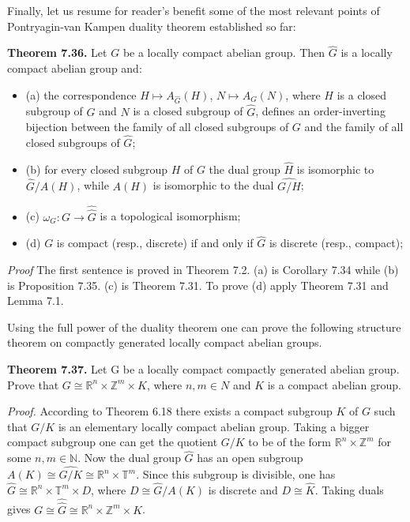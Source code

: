 \documentclass[12pt]{article}
\begin{document}
Finally, let us resume for reader's benefit some of the most relevant points of Pontryagin-van Kampen duality
theorem established so far:


\textbf{Theorem 7.36.} Let $G$ be a locally compact abelian group. Then $\hat{G}$ is a locally compact abelian group and:


\begin{itemize}

    \item (a) the correspondence $H \mapsto A_{\hat{G}}(H)$, $N \mapsto A_G(N)$, where $H$ is a closed subgroup of $G$ and $N$ is a closed
    subgroup of $\hat{G}$, defines an order-inverting bijection between the family of all closed subgroups of $G$ and the
    family of all closed subgroups of $\hat{G}$;

    \item (b) for every closed subgroup $H$ of $G$ the dual group $\hat{H}$ is isomorphic to $\hat{G}/A (H)$, while $A(H)$ is isomorphic
    to the dual $\hat{G/H}$;

    \item (c) $\omega_G : G \to \hat{\hat{G}}$ is a topological isomorphism;

    \item (d) $G$ is compact (resp., discrete) if and only if $\hat{G}$ is discrete (resp., compact);

\end{itemize}


\emph{Proof} The first sentence is proved in Theorem 7.2. (a) is Corollary 7.34 while (b) is Proposition 7.35. (c) is
Theorem 7.31. To prove (d) apply Theorem 7.31 and Lemma 7.1.


    Using the full power of the duality theorem one can prove the following structure theorem on compactly
generated locally compact abelian groups.


\textbf{Theorem 7.37.} Let G be a locally compact compactly generated abelian group. Prove that $G \cong \mathbb{R}^n \times \mathbb{Z}^m \times K$,
where $n, m \in N$ and $K$ is a compact abelian group.


\emph{Proof.} According to Theorem 6.18 there exists a compact subgroup $K$ of $G$ such that $G/K$ is an elementary
locally compact abelian group. Taking a bigger compact subgroup one can get the quotient $G/K$ to be of the
form $\mathbb{R}^n \times \mathbb{Z}^m$ for some $n, m \in \mathbb{N}$. Now the dual group $\hat{G}$ has an open subgroup $A(K) \cong \hat{G/K} \cong \mathbb{R}^n \times \mathbb{T}^m$.
Since this subgroup is divisible, one has $\hat{G} \cong \mathbb{R}^n \times \mathbb{T}^m \times D$, where $D \cong \hat{G}/A (K)$ is discrete and $D \cong \hat{K}$. Taking
duals gives $G \cong \hat{\hat{G}} \cong \mathbb{R}^n \times \mathbb{Z}^m \times K$.
\end{document}
